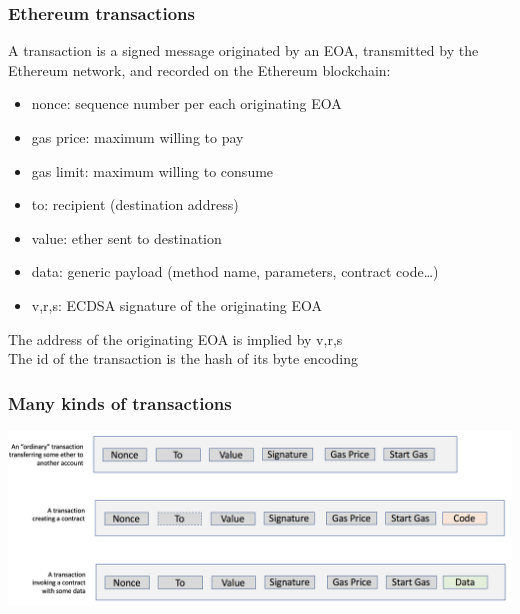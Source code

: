 \documentclass[11pt]{beamer}  %
\begin{document}
\begin{frame}\frametitle{Ethereum transactions}

  \begin{greenbox}{}
    A transaction is a signed message originated by an EOA, transmitted
    by the Ethereum network, and recorded on the Ethereum blockchain:
    \begin{itemize}
    \item nonce: sequence number per each originating EOA
    \item gas price: maximum willing to pay
    \item gas limit: maximum willing to consume
    \item to: recipient (destination address)
    \item value: ether sent to destination
    \item data: generic payload (method name, parameters, contract code\ldots)
    \item v,r,s: ECDSA signature of the originating EOA
    \end{itemize}
  \end{greenbox}

  \begin{center}
    The address of the originating EOA is implied by v,r,s\\
    The id of the transaction is the hash of its byte encoding
  \end{center}

\end{frame}

\begin{frame}\frametitle{Many kinds of transactions}

  \begin{center}
    \includegraphics[width=\textwidth,clip=false]{pictures/many-transactions.png}
  \end{center}

\end{frame}
\end{document}
